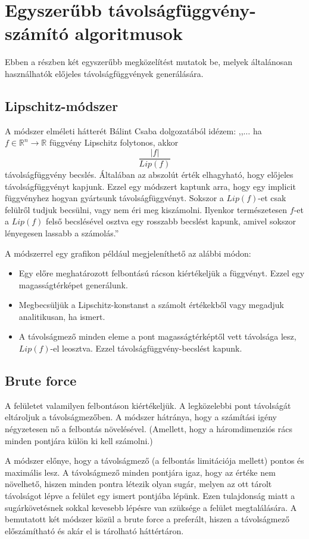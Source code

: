 \section{Egyszerűbb távolságfüggvény-számító algoritmusok}

Ebben a részben két egyszerűbb megközelítést mutatok be, melyek általánosan használhatók előjeles távolságfüggvények generálására.

\subsection{Lipschitz-módszer}
A módszer elméleti hátterét Bálint Csaba dolgozatából \cite[18. o.]{BalintCsaba} idézem: ,,$\dots$ ha $f \in \mathbb{R}^n \rightarrow \mathbb{R}$ függvény Lipschitz folytonos, akkor
$$ \frac{|f|}{Lip(f)} $$
távolságfüggvény becslés. Általában az abszolút érték elhagyható, hogy előjeles távolságfüggvényt kapjunk. Ezzel egy módszert kaptunk arra, hogy egy implicit függvényhez hogyan gyártsunk távolságfüggvényt. Sokszor a $Lip(f)$-et csak felülről tudjuk becsülni, vagy nem éri meg kiszámolni. Ilyenkor természetesen $f$-et a $Lip(f)$ felső becslésével osztva egy rosszabb becslést kapunk, amivel sokszor lényegesen lassabb a számolás.''

A módszerrel egy grafikon például megjeleníthető az alábbi módon:
\begin{itemize}
	\item Egy előre meghatározott felbontású rácson kiértékeljük a függvényt. Ezzel egy magasságtérképet generálunk.
	\item Megbecsüljük a Lipschitz-konstanst a számolt értékekből vagy megadjuk analitikusan, ha ismert.
	\item A távolságmező minden eleme a pont magasságtérképtől vett távolsága lesz, $Lip(f)$-el leosztva. Ezzel távolságfüggvény-becslést kapunk.
\end{itemize}

\subsection{Brute force}
A felületet valamilyen felbontáson kiértékeljük. A legközelebbi pont távolságát eltároljuk a távolságmezőben. A módszer hátránya, hogy a számítási igény négyzetesen nő a felbontás növelésével. (Amellett, hogy a háromdimenziós rács minden pontjára külön ki kell számolni.)

A módszer előnye, hogy a távolságmező (a felbontás limitációja mellett) pontos és maximális lesz. A távolságmező minden pontjára igaz, hogy az értéke nem növelhető, hiszen minden pontra létezik olyan sugár, melyen az ott tárolt távolságot lépve a felület egy ismert pontjába lépünk. Ezen tulajdonság miatt a sugárkövetésnek sokkal kevesebb lépésre van szüksége a felület megtalálására. A bemutatott két módszer közül a brute force a preferált, hiszen a távolságmező előszámítható és akár el is tárolható háttértáron.


